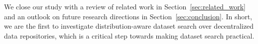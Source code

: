We close our study with a review of related work in Section~\ref{sec:related_work} and an outlook on future research directions in Section~\ref{sec:conclusion}.
In short, we are the first to investigate distribution-aware dataset search over decentralized data repositories, which is a critical step towards making dataset search practical.
